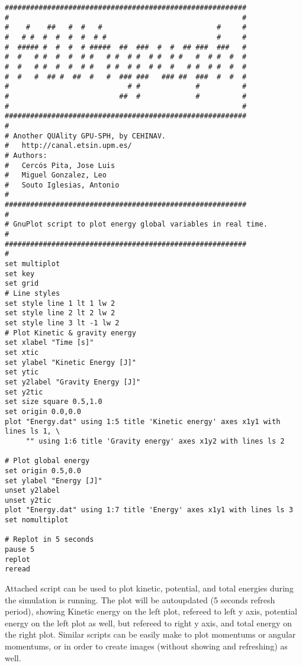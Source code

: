 \begin{verbatim}
#########################################################
#                                                       #
#    #    ##   #  #   #                           #     #
#   # #  #  #  #  #  # #                          #     #
#  ##### #  #  #  # #####  ##  ###  #  #  ## ###  ###   #
#  #   # #  #  #  # #   # #  # #  # #  # #   #  # #  #  #
#  #   # #  #  #  # #   # #  # #  # #  #   # #  # #  #  #
#  #   #  ## #  ##  #   #  ### ###   ### ##  ###  #  #  #
#                            # #             #          #
#                          ##  #             #          #
#                                                       #
#########################################################
#
# Another QUAlity GPU-SPH, by CEHINAV.
#	http://canal.etsin.upm.es/
# Authors:
#	Cercós Pita, Jose Luis
#	Miguel Gonzalez, Leo
#	Souto Iglesias, Antonio
#
#########################################################
#
# GnuPlot script to plot energy global variables in real time.
#
#########################################################
#
set multiplot
set key
set grid
# Line styles
set style line 1 lt 1 lw 2
set style line 2 lt 2 lw 2
set style line 3 lt -1 lw 2
# Plot Kinetic & gravity energy
set xlabel "Time [s]"
set xtic
set ylabel "Kinetic Energy [J]"
set ytic
set y2label "Gravity Energy [J]"
set y2tic
set size square 0.5,1.0
set origin 0.0,0.0
plot "Energy.dat" using 1:5 title 'Kinetic energy' axes x1y1 with lines ls 1, \
     "" using 1:6 title 'Gravity energy' axes x1y2 with lines ls 2

# Plot global energy
set origin 0.5,0.0
set ylabel "Energy [J]"
unset y2label
unset y2tic
plot "Energy.dat" using 1:7 title 'Energy' axes x1y1 with lines ls 3
set nomultiplot

# Replot in 5 seconds
pause 5
replot
reread
\end{verbatim}
%
Attached script can be used to plot kinetic, potential, and total energies during
the simulation is running. The plot will be autoupdated (5 seconds refresh period),
showing Kinetic energy on the left plot, refereed to left y axis, potential energy
on the left plot as well, but refereed to right y axis, and total energy on the
right plot.\rc
%
Similar scripts can be easily make to plot momentums or angular momentums, or in
order to create images (without showing and refreshing) as well.
%
